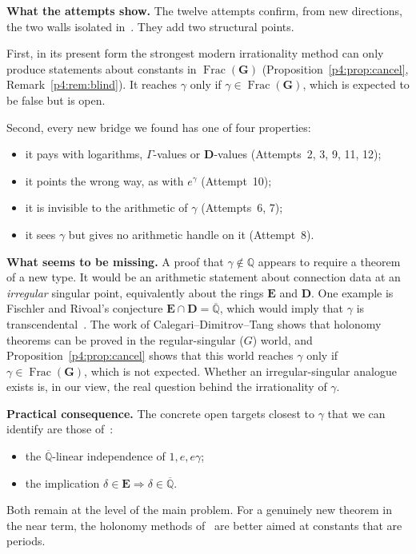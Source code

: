 \documentclass[11pt,a4paper]{article}
\theoremstyle{definition}
\theoremstyle{remark}
\newcommand{\Q}{\mathbb Q}
\newcommand{\Qbar}{\overline{\mathbb Q}}
\newcommand{\bG}{\mathbf G}
\newcommand{\bE}{\mathbf E}
\newcommand{\bD}{\mathbf D}
\DeclareMathOperator{\Frac}{Frac}
\numberwithin{equation}{section}
\begin{document}
\medskip\noindent\textbf{What the attempts show.} The twelve attempts confirm, from new directions, the two walls isolated in~\cite{p4:K1,p4:K2,p4:K3,p4:K4,p4:K5}. They add two structural points.

First, in its present form the strongest modern irrationality method can only produce statements about constants in $\Frac(\bG)$ (Proposition~\ref{p4:prop:cancel}, Remark~\ref{p4:rem:blind}). It reaches $\gamma$ only if $\gamma\in\Frac(\bG)$, which is expected to be false but is open.

Second, every new bridge we found has one of four properties:
\begin{itemize}[leftmargin=2em]
\item it pays with logarithms, $\Gamma$-values or $\bD$-values (Attempts~2, 3, 9, 11, 12);
\item it points the wrong way, as with $e^\gamma$ (Attempt~10);
\item it is invisible to the arithmetic of $\gamma$ (Attempts~6, 7);
\item it sees $\gamma$ but gives no arithmetic handle on it (Attempt~8).
\end{itemize}

\medskip\noindent\textbf{What seems to be missing.} A proof that $\gamma\notin\Q$ appears to require a theorem of a new type. It would be an arithmetic statement about connection data at an \emph{irregular} singular point, equivalently about the rings $\bE$ and $\bD$. One example is Fischler and Rivoal's conjecture $\bE\cap\bD=\Qbar$, which would imply that $\gamma$ is transcendental~\cite{p4:FR24}. The work of Calegari--Dimitrov--Tang shows that holonomy theorems can be proved in the regular-singular ($G$) world, and Proposition~\ref{p4:prop:cancel} shows that this world reaches $\gamma$ only if $\gamma\in\Frac(\bG)$, which is not expected. Whether an irregular-singular analogue exists is, in our view, the real question behind the irrationality of $\gamma$.

\medskip\noindent\textbf{Practical consequence.} The concrete open targets closest to $\gamma$ that we can identify are those of~\cite{p4:K1}:
\begin{itemize}[leftmargin=2em]
\item the $\Qbar$-linear independence of $1,e,e\gamma$;
\item the implication $\delta\in\bE\Rightarrow\delta\in\Qbar$.
\end{itemize}
Both remain at the level of the main problem. For a genuinely new theorem in the near term, the holonomy methods of~\cite{p4:CDT} are better aimed at constants that are periods.
\end{document}
